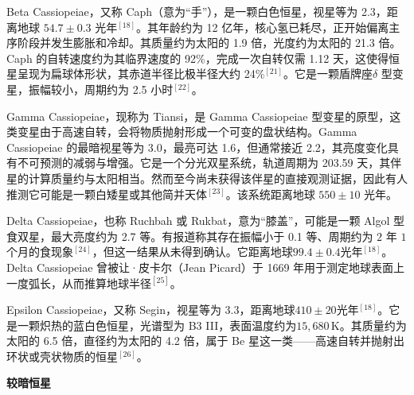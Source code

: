 Beta Cassiopeiae，又称 Caph（意为“手”），是一颗白色恒星，视星等为 2.3，距离地球 $54.7\pm0.3$ 光年$^{[18]}$。其年龄约为 12 亿年，核心氢已耗尽，正开始偏离主序阶段并发生膨胀和冷却。其质量约为太阳的 1.9 倍，光度约为太阳的 21.3 倍。Caph 的自转速度约为其临界速度的 92\%，完成一次自转仅需 1.12 天，这使得恒星呈现为扁球体形状，其赤道半径比极半径大约 24\%$^{[21]}$。它是一颗盾牌座$\delta$ 型变星，振幅较小，周期约为 2.5 小时$^{[22]}$。

Gamma Cassiopeiae，现称为 Tiansi，是 Gamma Cassiopeiae 型变星的原型，这类变星由于高速自转，会将物质抛射形成一个可变的盘状结构。Gamma Cassiopeiae 的最暗视星等为 3.0，最亮可达 1.6，但通常接近 2.2，其亮度变化具有不可预测的减弱与增强。它是一个分光双星系统，轨道周期为 203.59 天，其伴星的计算质量约与太阳相当。然而至今尚未获得该伴星的直接观测证据，因此有人推测它可能是一颗白矮星或其他简并天体$^{[23]}$。该系统距离地球 $550\pm10$ 光年。

Delta Cassiopeiae，也称 Ruchbah 或 Rukbat，意为“膝盖”，可能是一颗 Algol 型食双星，最大亮度约为 2.7 等。有报道称其存在振幅小于 0.1 等、周期约为 $2$ 年 $1$ 个月的食现象$^{[24]}$，但这一结果从未得到确认。它距离地球$99.4\pm0.4$光年$^{[18]}$。Delta Cassiopeiae 曾被让·皮卡尔（Jean Picard）于 1669 年用于测定地球表面上一度弧长，从而推算地球半径$^{[25]}$。

Epsilon Cassiopeiae，又称 Segin，视星等为 3.3，距离地球$410\pm20$光年$^{[18]}$。它是一颗炽热的蓝白色恒星，光谱型为 B3 III，表面温度约为$15{,}680\,\mathrm{K}$。其质量约为太阳的 6.5 倍，直径约为太阳的 4.2 倍，属于 Be 星这一类——高速自转并抛射出环状或壳状物质的恒星$^{[26]}$。

\textbf{较暗恒星}
